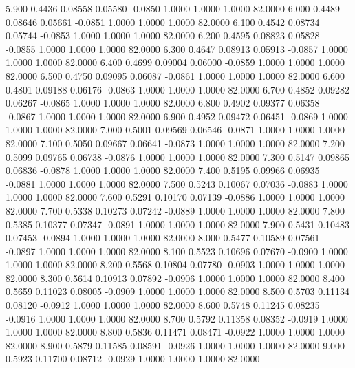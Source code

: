    5.900   0.4436   0.08558   0.05580  -0.0850   1.0000   1.0000   1.0000  82.0000
   6.000   0.4489   0.08646   0.05661  -0.0851   1.0000   1.0000   1.0000  82.0000
   6.100   0.4542   0.08734   0.05744  -0.0853   1.0000   1.0000   1.0000  82.0000
   6.200   0.4595   0.08823   0.05828  -0.0855   1.0000   1.0000   1.0000  82.0000
   6.300   0.4647   0.08913   0.05913  -0.0857   1.0000   1.0000   1.0000  82.0000
   6.400   0.4699   0.09004   0.06000  -0.0859   1.0000   1.0000   1.0000  82.0000
   6.500   0.4750   0.09095   0.06087  -0.0861   1.0000   1.0000   1.0000  82.0000
   6.600   0.4801   0.09188   0.06176  -0.0863   1.0000   1.0000   1.0000  82.0000
   6.700   0.4852   0.09282   0.06267  -0.0865   1.0000   1.0000   1.0000  82.0000
   6.800   0.4902   0.09377   0.06358  -0.0867   1.0000   1.0000   1.0000  82.0000
   6.900   0.4952   0.09472   0.06451  -0.0869   1.0000   1.0000   1.0000  82.0000
   7.000   0.5001   0.09569   0.06546  -0.0871   1.0000   1.0000   1.0000  82.0000
   7.100   0.5050   0.09667   0.06641  -0.0873   1.0000   1.0000   1.0000  82.0000
   7.200   0.5099   0.09765   0.06738  -0.0876   1.0000   1.0000   1.0000  82.0000
   7.300   0.5147   0.09865   0.06836  -0.0878   1.0000   1.0000   1.0000  82.0000
   7.400   0.5195   0.09966   0.06935  -0.0881   1.0000   1.0000   1.0000  82.0000
   7.500   0.5243   0.10067   0.07036  -0.0883   1.0000   1.0000   1.0000  82.0000
   7.600   0.5291   0.10170   0.07139  -0.0886   1.0000   1.0000   1.0000  82.0000
   7.700   0.5338   0.10273   0.07242  -0.0889   1.0000   1.0000   1.0000  82.0000
   7.800   0.5385   0.10377   0.07347  -0.0891   1.0000   1.0000   1.0000  82.0000
   7.900   0.5431   0.10483   0.07453  -0.0894   1.0000   1.0000   1.0000  82.0000
   8.000   0.5477   0.10589   0.07561  -0.0897   1.0000   1.0000   1.0000  82.0000
   8.100   0.5523   0.10696   0.07670  -0.0900   1.0000   1.0000   1.0000  82.0000
   8.200   0.5568   0.10804   0.07780  -0.0903   1.0000   1.0000   1.0000  82.0000
   8.300   0.5614   0.10913   0.07892  -0.0906   1.0000   1.0000   1.0000  82.0000
   8.400   0.5659   0.11023   0.08005  -0.0909   1.0000   1.0000   1.0000  82.0000
   8.500   0.5703   0.11134   0.08120  -0.0912   1.0000   1.0000   1.0000  82.0000
   8.600   0.5748   0.11245   0.08235  -0.0916   1.0000   1.0000   1.0000  82.0000
   8.700   0.5792   0.11358   0.08352  -0.0919   1.0000   1.0000   1.0000  82.0000
   8.800   0.5836   0.11471   0.08471  -0.0922   1.0000   1.0000   1.0000  82.0000
   8.900   0.5879   0.11585   0.08591  -0.0926   1.0000   1.0000   1.0000  82.0000
   9.000   0.5923   0.11700   0.08712  -0.0929   1.0000   1.0000   1.0000  82.0000
